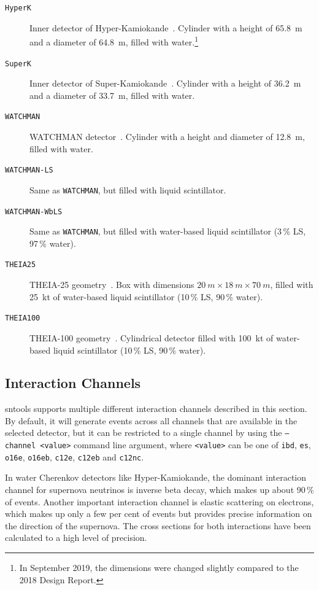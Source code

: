 \documentclass[11pt, oneside]{article}
\begin{document}
\begin{description}
\item[\texttt{HyperK}] Inner detector of Hyper-Kamiokande~\cite{HKDR2018}. Cylinder with a height of \SI{65.8}{m} and a diameter of \SI{64.8}{m}, filled with water.\footnote{In September 2019, the dimensions were changed slightly compared to the 2018 Design Report.}
\item[\texttt{SuperK}] Inner detector of Super-Kamiokande~\cite{Fukuda2003}. Cylinder with a height of \SI{36.2}{m} and a diameter of \SI{33.7}{m}, filled with water.
\item[\texttt{WATCHMAN}] WATCHMAN detector~\cite{Askins2015}. Cylinder with a height and diameter of \SI{12.8}{m}, filled with water.
\item[\texttt{WATCHMAN-LS}] Same as \texttt{WATCHMAN}, but filled with liquid scintillator.
\item[\texttt{WATCHMAN-WbLS}] Same as \texttt{WATCHMAN}, but filled with water-based liquid scintillator (3\,\% LS, 97\,\% water).
\item[\texttt{THEIA25}] THEIA-25 geometry~\cite{Askins2020}. Box with dimensions $\SI{20}{m}\times\SI{18}{m}\times\SI{70}{m}$, filled with \SI{25}{kt} of water-based liquid scintillator (10\,\% LS, 90\,\% water).
\item[\texttt{THEIA100}] THEIA-100 geometry~\cite{Askins2020}. Cylindrical detector filled with \SI{100}{kt} of water-based liquid scintillator (10\,\% LS, 90\,\% water).
\end{description}


\subsection{Interaction Channels} \label{sec:interaction-channels}
sntools supports multiple different interaction channels described in this section.
By default, it will generate events across all channels that are available in the selected detector, but it can be restricted to a single channel by using the \texttt{--channel <value>} command line argument, where \texttt{<value>} can be one of \texttt{ibd}, \texttt{es}, \texttt{o16e}, \texttt{o16eb}, \texttt{c12e}, \texttt{c12eb} and \texttt{c12nc}.

In water Cherenkov detectors like Hyper-Kamiokande, the dominant interaction channel for supernova neutrinos is inverse beta decay, which makes up about 90\,\% of events.
Another important interaction channel is elastic scattering on electrons, which makes up only a few per cent of events but provides precise information on the direction of the supernova.
The cross sections for both interactions have been calculated to a high level of precision.
\end{document}
